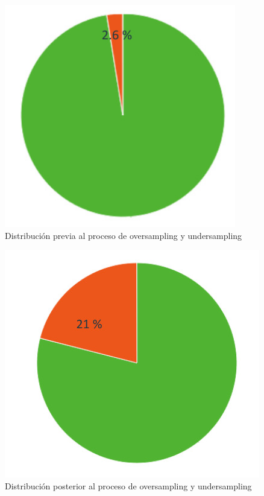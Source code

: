\documentclass[12pt]{report} %
\begin{document}
\begin{minipage}{0.45\textwidth}
    \begin{figure}[H]
    \includegraphics[width=0.9\textwidth]{datos-prev.jpg}
    \caption  {\small{Distribución previa al proceso de oversampling y undersampling}}
    \end{figure}
\end{minipage}
\hspace{0.5cm}
\begin{minipage}{0.45\textwidth}
    \begin{figure}[H]
    \includegraphics[width=\textwidth]{datos-post.jpg}
    \caption  {\small{Distribución posterior al proceso de oversampling y undersampling}}
    \end{figure}
\end{minipage}
\end{document}

